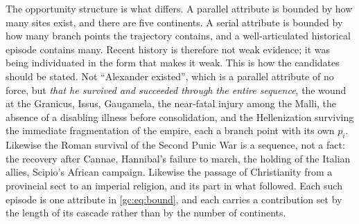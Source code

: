 \documentclass[11pt]{article}
\numberwithin{equation}{section}
\theoremstyle{plain}
\theoremstyle{definition}
\theoremstyle{remark}
\begin{document}
\noindent The opportunity structure is what differs. A parallel
attribute is bounded by how many sites exist, and there are five
continents. A serial attribute is bounded by how many branch points the
trajectory contains, and a well-articulated historical episode contains
many. Recent history is therefore not weak evidence; it was being
individuated in the form that makes it weak. This is how the candidates should be stated. Not ``Alexander existed'',
which is a parallel attribute of no force, but \emph{that he survived
and succeeded through the entire sequence}, the wound at the
Granicus, Issus, Gaugamela, the near-fatal injury among the Malli, the
absence of a disabling illness before consolidation, and the
Hellenization surviving the immediate fragmentation of the empire, each a branch point with its own $p_i$. Likewise the Roman survival of
the Second Punic War is a sequence, not a fact: the recovery after
Cannae, Hannibal's failure to march, the holding of the Italian allies,
Scipio's African campaign. Likewise the passage of Christianity from a
provincial sect to an imperial religion, and its part in what followed.
Each such episode is one attribute in \eqref{gc:eq:bound}, and each
carries a contribution set by the length of its cascade rather than by
the number of continents.
\end{document}
